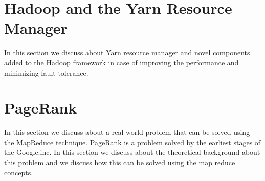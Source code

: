 


\section{Hadoop and the Yarn Resource Manager}

In this section we discuss about Yarn resource manager and novel
components added to the Hadoop framework in case of improving the
performance and minimizing fault tolerance.



\section{PageRank}

In this section we discuss about a real world problem that can be
solved using the MapReduce technique. PageRank is a problem solved by
the earliest stages of the Google.inc. In this section we discuss
about the theoretical background about this problem and we discuss how
this can be solved using the map reduce concepts.



